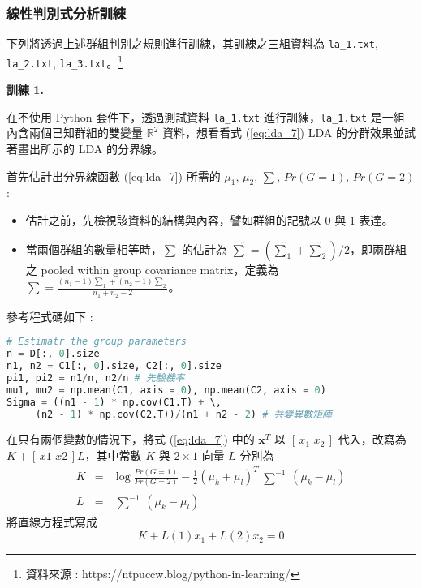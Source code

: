 \subsubsection{線性判別式分析訓練}

下列將透過上述群組判別之規則進行訓練，其訓練之三組資料為 \verb|la_1.txt|, \verb|la_2.txt|, \verb|la_3.txt|。\footnote{資料來源 : https://ntpuccw.blog/python-in-learning/}

\textbf{\large 訓練 1.}

在不使用 Python 套件下，透過測試資料 \verb|la_1.txt| 進行訓練，\verb|la_1.txt| 是一組內含兩個已知群組的雙變量 $\mathbb{R}^2$ 資料，想看看式 (\ref{eq:lda_7}) LDA 的分群效果並試著畫出所示的 LDA 的分界線。

首先估計出分界線函數 (\ref{eq:lda_7}) 所需的 $\mu_1,\, \mu_2,\, \sum,\, Pr(G = 1),\, Pr(G = 2)$ :
\begin{itemize}
\item
估計之前，先檢視該資料的結構與內容，譬如群組的記號以 $0$ 與 $1$ 表達。
\item
當兩個群組的數量相等時，$\sum$ 的估計為 $\hat{\sum} = (\hat{\sum}_1 + \hat{\sum}_2)/2$，即兩群組之 pooled within group covariance matrix，定義為 $\sum = \frac{(n_1-1)\sum_1 + (n_2-1)\sum_2}{n_1 + n_2 -2}$。
\end{itemize}

參考程式碼如下 :
\bigskip
\begin{lstlisting}[language = Python]
# Estimatr the group parameters
n = D[:, 0].size
n1, n2 = C1[:, 0].size, C2[:, 0].size
pi1, pi2 = n1/n, n2/n # 先驗機率
mu1, mu2 = np.mean(C1, axis = 0), np.mean(C2, axis = 0)
Sigma = ((n1 - 1) * np.cov(C1.T) + \,
	 (n2 - 1) * np.cov(C2.T))/(n1 + n2 - 2) # 共變異數矩陣
\end{lstlisting}

在只有兩個變數的情況下，將式 (\ref{eq:lda_7}) 中的 $\mathbf{x}^T$ 以 $[\,x_1\,\, x_2\,]$ 代入，改寫為 $K + [\,x1\,\, x2\,]L$，其中常數 $K$ 與 $2 \times 1$ 向量 $L$ 分別為
\begin{eqnarray}
K
& = &
\log \frac{Pr(G = 1)}{Pr(G = 2)} - \frac{1}{2}(\mu_k + \mu_l)^T \begin{matrix} \sum^{-1} \end{matrix}(\mu_k - \mu_l) \nonumber \\
L
& = & 
\begin{matrix} \sum^{-1} \end{matrix}(\mu_k - \mu_l) \nonumber 
\end{eqnarray}
將直線方程式寫成
\[K + L(1)x_1 + L(2)x_2 = 0\]

